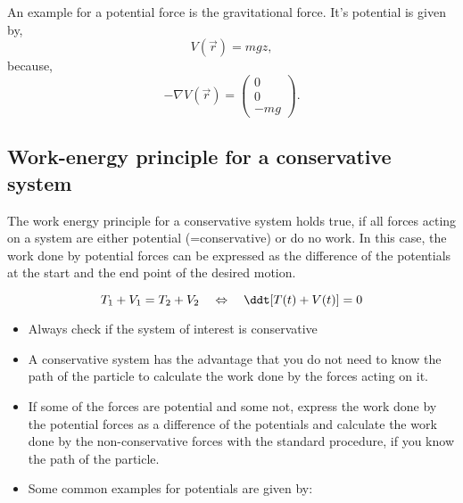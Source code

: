 \documentclass[10pt,a4paper]{scrartcl}
\begin{document}
\begin{multicols*}{2}
\vspace{12pt}
An example for a potential force is the gravitational force. It's potential is given by,
\begin{equation*}
V(\vec{r}) = mgz,
\end{equation*} 
because, 
\begin{equation*}
-\nabla V(\vec{r}) = \begin{pmatrix}
0 \\ 0 \\ -mg \end{pmatrix}.
\end{equation*}

\subsection{Work-energy principle for a conservative system}
The work energy principle for a conservative system holds true, if all forces acting on a system are either potential (=conservative) or do no work. In this case, the work done by potential forces can be expressed as the difference of the potentials at the start and the end point of the desired motion.

\begin{equation*}
T_1+V_1 =T_2+V_2\quad\Leftrightarrow\quad \ddt[T(t)+V(t)]=0
\end{equation*}


\begin{itemize}
\item Always check if the system of interest is conservative
\item A conservative system has the advantage that you do not need to know the path of the particle to calculate the work done by the forces acting on it.
\item If some of the forces are potential and some not, express the work done by the potential forces as a difference of the potentials and calculate the work done by the non-conservative forces with the standard procedure, if you know the path of the particle.
\item Some common examples for potentials are given by:


\end{itemize}
\end{multicols*}
\end{document}
